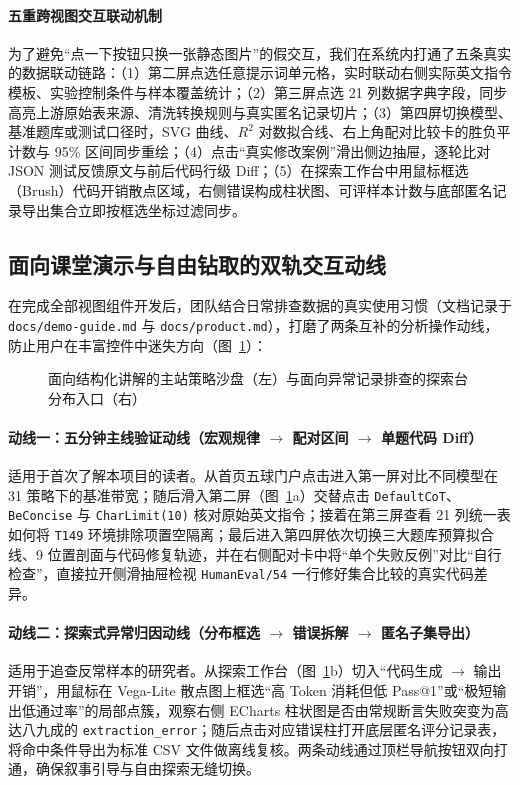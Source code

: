 \paragraph{五重跨视图交互联动机制}为了避免“点一下按钮只换一张静态图片”的假交互，我们在系统内打通了五条真实的数据联动链路：（1）第二屏点选任意提示词单元格，实时联动右侧实际英文指令模板、实验控制条件与样本覆盖统计；（2）第三屏点选 21 列数据字典字段，同步高亮上游原始表来源、清洗转换规则与真实匿名记录切片；（3）第四屏切换模型、基准题库或测试口径时，SVG 曲线、$R^2$ 对数拟合线、右上角配对比较卡的胜负平计数与 95\% 区间同步重绘；（4）点击“真实修改案例”滑出侧边抽屉，逐轮比对 JSON 测试反馈原文与前后代码行级 Diff；（5）在探索工作台中用鼠标框选（Brush）代码开销散点区域，右侧错误构成柱状图、可评样本计数与底部匿名记录导出集合立即按框选坐标过滤同步。


\subsection{面向课堂演示与自由钻取的双轨交互动线}

在完成全部视图组件开发后，团队结合日常排查数据的真实使用习惯（文档记录于 \texttt{docs/demo-guide.md} 与 \texttt{docs/product.md}），打磨了两条互补的分析操作动线，防止用户在丰富控件中迷失方向（图~\ref{fig:demo-paths}）：

\begin{figure}[!htbp]
\centering
{}\hfill
{}
\caption{面向结构化讲解的主站策略沙盘（左）与面向异常记录排查的探索台分布入口（右）}
\label{fig:demo-paths}
\end{figure}

\paragraph{动线一：五分钟主线验证动线（宏观规律 $\to$ 配对区间 $\to$ 单题代码 Diff）}适用于首次了解本项目的读者。从首页五球门户点击进入第一屏对比不同模型在 31 策略下的基准带宽；随后滑入第二屏（图~\ref{fig:demo-paths}a）交替点击 \texttt{DefaultCoT}、\texttt{BeConcise} 与 \texttt{CharLimit(10)} 核对原始英文指令；接着在第三屏查看 21 列统一表如何将 \texttt{T149} 环境排除项置空隔离；最后进入第四屏依次切换三大题库预算拟合线、9 位置剖面与代码修复轨迹，并在右侧配对卡中将“单个失败反例”对比“自行检查”，直接拉开侧滑抽屉检视 \texttt{HumanEval/54} 一行修好集合比较的真实代码差异。

\paragraph{动线二：探索式异常归因动线（分布框选 $\to$ 错误拆解 $\to$ 匿名子集导出）}适用于追查反常样本的研究者。从探索工作台（图~\ref{fig:demo-paths}b）切入“代码生成 $\to$ 输出开销”，用鼠标在 Vega-Lite 散点图上框选“高 Token 消耗但低 Pass@1”或“极短输出低通过率”的局部点簇，观察右侧 ECharts 柱状图是否由常规断言失败突变为高达八九成的 \texttt{extraction\_error}；随后点击对应错误柱打开底层匿名评分记录表，将命中条件导出为标准 CSV 文件做离线复核。两条动线通过顶栏导航按钮双向打通，确保叙事引导与自由探索无缝切换。
